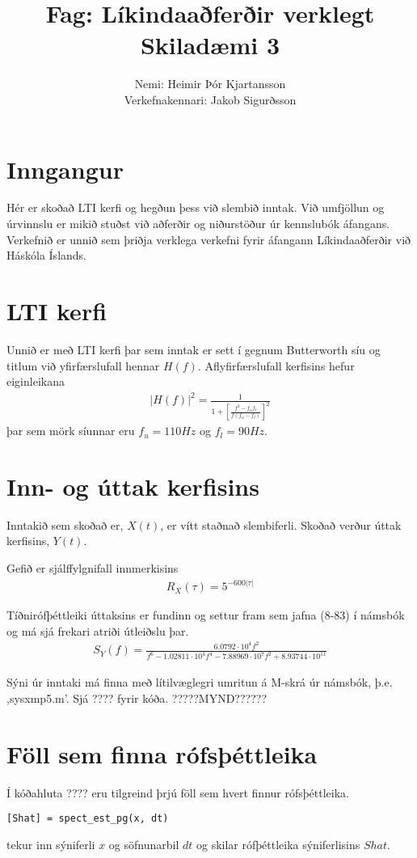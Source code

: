 \documentclass[11pt,a4paper]{article}
\author{Nemi: Heimir Þór Kjartansson\\Verkefnakennari: Jakob Sigurðsson}
\title{Fag: Líkindaaðferðir verklegt \\ Skiladæmi 3}
\begin{document}
\maketitle
\section{Inngangur}
Hér er skoðað LTI kerfi og hegðun þess við slembið inntak. Við umfjöllun
og úrvinnslu er mikið stuðst við aðferðir og niðurstöður úr kennslubók
áfangans. Verkefnið er unnið sem þriðja verklega verkefni fyrir áfangann
Líkindaaðferðir við Háskóla Íslands.
\section{LTI kerfi}
Unnið er með LTI kerfi þar sem inntak er sett í gegnum Butterworth síu
og titlum við yfirfærslufall hennar $H(f)$. 
Aflyfirfærslufall kerfisins hefur eiginleikana
\begin{eqnarray*}
    |H(f)|^2 = \frac{1}{1+\left[\frac{f^2-f_uf_l}{f(f_u-f_l)}\right]^2}
\end{eqnarray*}
þar sem mörk síunnar eru $f_u=110Hz$ og $f_l=90Hz$.
\section{Inn- og úttak kerfisins} 
Inntakið sem skoðað er, $X(t)$, er vítt staðnað slembiferli. Skoðað 
verður úttak kerfisins, $Y(t)$.

Gefið er sjálffylgnifall innmerkisins
\begin{eqnarray*}
    R_X(\tau)=5^{-600|\tau|}
\end{eqnarray*}

Tíðnirófþéttleiki úttaksins er fundinn og settur fram sem jafna
(8-83) í námsbók og má sjá frekari atriði útleiðslu þar.
\begin{eqnarray*}
    S_Y(f)=\frac{6.0792\cdot 10^4 f^2}{f^6 -1.02811\cdot 10^4 f^4
    -7.88969\cdot 10^7 f^2 +8.93744 \cdot 10^{11}}
\end{eqnarray*}

Sýni úr inntaki má finna með lítilvæglegri umritun á M-skrá úr 
námsbók, þ.e. ,sysxmp5.m'. Sjá ???? fyrir kóða.
?????MYND??????
\section{Föll sem finna rófsþéttleika} \label{se:foll}
Í kóðahluta ???? eru tilgreind þrjú föll sem hvert finnur 
rófsþéttleika. 
\begin{verbatim}
[Shat] = spect_est_pg(x, dt)
\end{verbatim}
tekur inn sýniferli $x$ og söfnunarbil $dt$ og skilar rófþéttleika 
sýniferlisins $Shat$.
\end{document}
